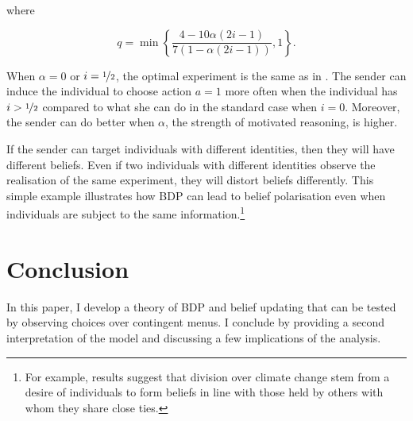 where

\[
	q = \min \left\{ \frac{4 - 10 \alpha \left( 2i - 1\right)}{7 \left( 1 - \alpha \left( 2i  - 1 \right) \right)}, 1 \right\}.
\]

When \( \alpha = 0 \) or \( i = \nicefrac{1}{2} \), the optimal experiment is the same as in \cite{kamenicaBayesianPersuasion2011}. The sender can induce the individual to choose action \( a = 1 \) more often when the individual has \( i > \nicefrac{1}{2} \) compared to what she can do in the standard case when \( i = 0 \). Moreover, the sender can do better when \( \alpha \), the strength of motivated reasoning, is higher.

If the sender can target individuals with different identities, then they will have different beliefs. Even if two individuals with different identities observe the realisation of the same experiment, they will distort beliefs differently. This simple example illustrates how BDP can lead to belief polarisation even when individuals are subject to the same information.\footnote{For example, \cite{kahanPolarizingImpactScience2012} results suggest that division over climate change stem from a desire of individuals to form beliefs in line with those held by others with whom they share close ties.}

\section{Conclusion}\label{sec:conclusion}

In this paper, I develop a theory of BDP and belief updating that can be tested by observing choices over contingent menus. I conclude by providing a second interpretation of the model and discussing a few implications of the analysis.

